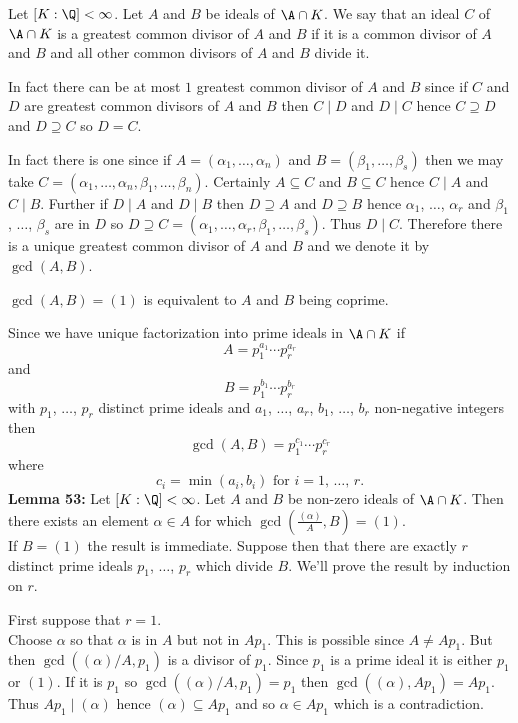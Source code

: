 Let $[K:\Q]<\infty$.  Let $A$ and $B$ be ideals of $\A\cap K$.  We say that an ideal $C$ of $\A\cap K$ is a greatest common divisor of $A$ and $B$ if it is a common divisor of $A$ and $B$ and all other common divisors of $A$ and $B$ divide it.

In fact there can be at most $1$ greatest common divisor of $A$ and $B$ since if $C$ and $D$ are greatest common divisors of $A$ and $B$ then $C\mid D$ and $D\mid C$ hence $C\supseteq D$ and $D\supseteq C$ so $D=C$.

In fact there is one since if $A=(\alpha_1,\dotsc,\alpha_n)$ and $B=(\beta_1,\dotsc,\beta_s)$ then we may take $C=(\alpha_1,\dotsc,\alpha_n,\beta_1,\dotsc,\beta_n)$.  Certainly $A\subseteq C$ and $B\subseteq C$ hence $C\mid A$ and $C\mid B$.  Further if $D\mid A$ and $D\mid B$ then $D\supseteq A$ and $D\supseteq B$ hence $\alpha_1$, $\dotsc$, $\alpha_r$ and $\beta_1$, $\dotsc$, $\beta_s$ are in $D$ so $D\supseteq C=(\alpha_1,\dotsc,\alpha_r,\beta_1,\dotsc,\beta_s)$.  Thus $D\mid C$.  Therefore there is a unique greatest common divisor of $A$ and $B$ and we denote it by $\gcd(A,B)$.

$\gcd(A,B)=(1)$ is equivalent to $A$ and $B$ being coprime.

Since we have unique factorization into prime ideals in $\A\cap K$ if
\[ A = p_1^{a_1}\dotsm p_r^{a_r} \]
and
\[ B = p_1^{b_1}\dotsm p_r^{b_r} \]
with $p_1$, $\dotsc$, $p_r$ distinct prime ideals and $a_1$, $\dotsc$, $a_r$, $b_1$, $\dotsc$, $b_r$ non-negative integers then
\[ \gcd(A,B) = p_1^{c_1} \dotsm p_r^{c_r} \]
where
\[ c_i = \min(a_i,b_i) \text{ for $i=1$, $\dotsc$, $r$} . \]
\textbf{Lemma 53:} Let $[K:\Q]<\infty$.  Let $A$ and $B$ be non-zero ideals of $\A\cap K$.  Then there exists an element $\alpha\in A$ for which $\gcd(\frac{(\alpha)}{A},B)=(1)$. \\
\pf If $B=(1)$ the result is immediate.  Suppose then that there are exactly $r$ distinct prime ideals $p_1$, $\dotsc$, $p_r$ which divide $B$.  We'll prove the result by induction on $r$.

First suppose that $r=1$. \\
Choose $\alpha$ so that $\alpha$ is in $A$ but not in $Ap_1$.  This is possible since $A\neq Ap_1$.  But then $\gcd((\alpha)/A,p_1)$ is a divisor of $p_1$.  Since $p_1$ is a prime ideal it is either $p_1$ or $(1)$.  If it is $p_1$ so $\gcd((\alpha)/A,p_1)=p_1$ then $\gcd((\alpha),Ap_1)=Ap_1$.  Thus $Ap_1\mid(\alpha)$ hence $(\alpha)\subseteq Ap_1$ and so $\alpha\in Ap_1$ which is a contradiction.

